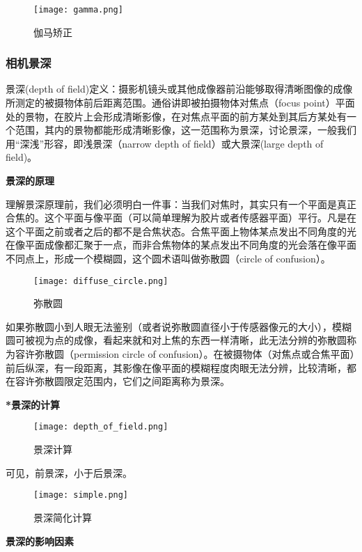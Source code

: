 \begin{figure}[H]
    \centering
    \texttt{[image: gamma.png]}
    \caption{伽马矫正} %
    \label{fig:伽马矫正} %
\end{figure}

\subsubsection{相机景深}
景深(depth of field)定义：摄影机镜头或其他成像器前沿能够取得清晰图像的成像所测定的被摄物体前后距离范围。通俗讲即被拍摄物体对焦点（focus point）平面处的景物，在胶片上会形成清晰影像，在对焦点平面的前方某处到其后方某处有一个范围，其内的景物都能形成清晰影像，这一范围称为景深，讨论景深，一般我们用“深浅”形容，即浅景深（narrow depth of field）或大景深(large depth of field)。

\textbf{景深的原理}

理解景深原理前，我们必须明白一件事：当我们对焦时，其实只有一个平面是真正合焦的。这个平面与像平面（可以简单理解为胶片或者传感器平面）平行。凡是在这个平面之前或者之后的都不是合焦状态。合焦平面上物体某点发出不同角度的光在像平面成像都汇聚于一点，而非合焦物体的某点发出不同角度的光会落在像平面不同点上，形成一个模糊圆，这个圆术语叫做弥散圆（circle of confusion）。

\begin{figure}[H]
    \centering
    \texttt{[image: diffuse\_circle.png]}
    \caption{弥散圆} %
    \label{fig:弥散圆} %
\end{figure}
如果弥散圆小到人眼无法鉴别（或者说弥散圆直径小于传感器像元的大小），模糊圆可被视为点的成像，看起来就和对上焦的东西一样清晰，此无法分辨的弥散圆称为容许弥散圆（permission circle of confusion）。在被摄物体（对焦点或合焦平面）前后纵深，有一段距离，其影像在像平面的模糊程度肉眼无法分辨，比较清晰，都在容许弥散圆限定范围内，它们之间距离称为景深。

\textbf{*景深的计算}

\begin{figure}[H]
    \centering
    \texttt{[image: depth\_of\_field.png]}
    \caption{景深计算} %
    \label{fig:景深计算} %
\end{figure}
可见，前景深，小于后景深。
\begin{figure}[H]
    \centering
    \texttt{[image: simple.png]}
    \caption{景深简化计算} %
    \label{fig:景深简化计算} %
\end{figure}
\textbf{景深的影响因素}

